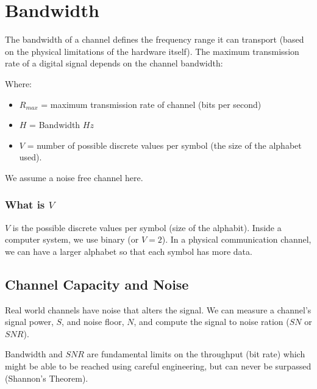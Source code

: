 \section{Bandwidth}\label{sec:bandwidth}

The bandwidth of a channel defines the frequency range it can transport (based on the physical limitations of the hardware itself).
The maximum transmission rate of a digital signal depends on the channel bandwidth:

\smallskip
\begin{minipage}{0.4\linewidth}
	\centering
\end{minipage}
\hfill
\begin{minipage}{0.55\linewidth}
	Where:
	\begin{itemize}
		\item \( R_{max} \) = maximum transmission rate of channel (bits per second)
		\item \(H\) = Bandwidth \(Hz\)
		\item \(V\) = number of possible discrete values per symbol (the size of the alphabet used).
	\end{itemize}
\end{minipage}
\begin{note}
	We assume a noise free channel here.
\end{note}

\subsubsection{What is \(V\)}\label{ssub:what_is_mk}

\(V\) is the possible discrete values per symbol (size of the alphabit).
Inside a computer system, we use binary (or \(V=2\)).
In a physical communication channel, we can have a larger alphabet so that each symbol has more data.

\subsection{Channel Capacity and Noise}\label{sub:channel_capacity_and_noise}

Real world channels have noise that alters the signal.
We can measure a channel's signal power, \(S\), and noise floor, \(N\), and compute the signal to noise ration (\(SN\) or \(SNR\)).

Bandwidth and \(SNR\) are fundamental limits on the throughput (bit rate) which might be able to be reached using careful engineering, but can never be surpassed (Shannon's Theorem).





